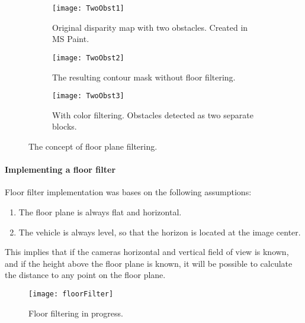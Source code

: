 \begin{figure}
	\centering
	\begin{subfigure}[b]{0.30\textwidth}
		\texttt{[image: TwoObst1]}
		\caption{Original disparity map with two obstacles. Created in MS Paint.}
		\label{fig:TwoObst1}
	\end{subfigure}
	\begin{subfigure}[b]{0.30\textwidth}
		\texttt{[image: TwoObst2]}
		\caption{The resulting contour mask without floor filtering.}
		\label{fig:TwoObst2}
	\end{subfigure}
	\begin{subfigure}[b]{0.30\textwidth}
		\texttt{[image: TwoObst3]}
		\caption{With color filtering. Obstacles detected as two separate blocks.}
		\label{fig:TwoObst3}
	\end{subfigure}
	\caption{\label{fig:blockSize}The concept of floor plane filtering.}
\end{figure}

\paragraph{Implementing a floor filter}

Floor filter implementation was bases on the following assumptions:

\begin{enumerate}
\item The floor plane is always flat and horizontal.
\item The vehicle is always level, so that the horizon is located at the image center.
\end{enumerate}

This implies that if the cameras horizontal and vertical field of view is known, and if the height above the floor plane is known, it will be possible to calculate the distance to any point on the floor plane.  


\begin{figure}
	\centering
	\texttt{[image: floorFilter]}
	\caption{Floor filtering in progress.}
	\label{fig:floorFilter}
\end{figure}
